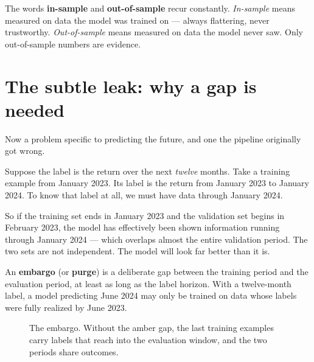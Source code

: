 \documentclass[11pt]{article}
\begin{document}
The words \textbf{in-sample} and \textbf{out-of-sample} recur constantly.
\emph{In-sample} means measured on data the model was trained on --- always flattering,
never trustworthy. \emph{Out-of-sample} means measured on data the model never saw.
Only out-of-sample numbers are evidence.

\section{The subtle leak: why a gap is needed}

Now a problem specific to predicting the future, and one the pipeline originally got
wrong.

Suppose the label is the return over the next \emph{twelve} months. Take a training
example from January 2023. Its label is the return from January 2023 to January 2024.
To know that label at all, we must have data through January 2024.

So if the training set ends in January 2023 and the validation set begins in February
2023, the model has effectively been shown information running through January 2024 ---
which overlaps almost the entire validation period. The two sets are not independent.
The model will look far better than it is.

\begin{specbox}
An \textbf{embargo} (or \textbf{purge}) is a deliberate gap between the training period
and the evaluation period, at least as long as the label horizon. With a twelve-month
label, a model predicting June 2024 may only be trained on data whose labels were fully
realized by June 2023.
\end{specbox}

\begin{figure}[H]
\centering
{}
\caption{The embargo. Without the amber gap, the last training examples carry labels
that reach into the evaluation window, and the two periods share outcomes.}
\end{figure}
\end{document}
